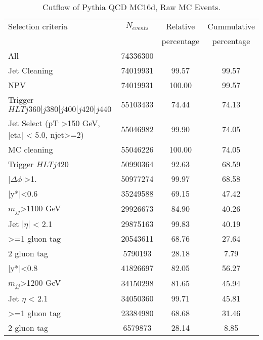 \begin{table}[ht]
\begin{center}
\begin{tabular}{|l|c|c|c|}
\hline
Selection criteria & $N_{events}$ & Relative & Cummulative \\
   &             & percentage & percentage \\
\hline
All & 74336300 &  & \\
Jet Cleaning & 74019931 & 99.57 & 99.57 \\
NPV & 74019931 & 100.00 & 99.57 \\
Trigger $HLT j360|j380|j400|j420|j440$ & 55103433 & 74.44 & 74.13 \\
Jet Select (pT >150 GeV, |eta| < 5.0, njet>=2) & 55046982 & 99.90 & 74.05 \\
MC cleaning & 55046226 & 100.00 & 74.05 \\
\hline
Trigger $HLT j420$ & 50990364 & 92.63 & 68.59 \\
$|\Delta\phi|$>1. & 50977274 & 99.97 & 68.58 \\
\hline\hline
|y*|<0.6 & 35249588 & 69.15 & 47.42 \\
$m_{jj}$>1100 GeV & 29926673 & 84.90 & 40.26 \\
Jet $|\eta|$ < 2.1 & 29875163 & 99.83 & 40.19 \\
>=1 gluon tag & 20543611 & 68.76 & 27.64 \\
2 gluon tag & 5790193 & 28.18 & 7.79 \\
\hline\hline
|y*|<0.8 & 41826697 & 82.05 & 56.27 \\
$m_{jj}$>1200 GeV & 34150298 & 81.65 & 45.94 \\
Jet $\eta$ < 2.1 & 34050360 & 99.71 & 45.81 \\
>=1 gluon tag & 23384980 & 68.68 & 31.46 \\
2 gluon tag & 6579873 & 28.14 & 8.85 \\
\hline
\end{tabular}
\end{center}
\caption{Cutflow of Pythia QCD MC16d, Raw MC Events.}
\end{table}%

